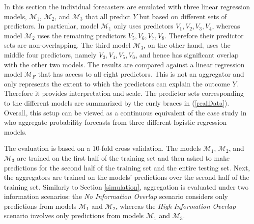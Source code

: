 \documentclass[11pt]{article}
\theoremstyle{definition}
\theoremstyle{definition}
\begin{document}
 In this section the individual forecasters are emulated with three linear regression models, $\mathcal{M}_1$, $\mathcal{M}_2$, and $\mathcal{M}_3$ that all predict $Y$ but based on different sets of predictors. In particular, model $\mathcal{M}_1$ only uses predictors $V_1, V_2, V_3, V_4$, whereas model $\mathcal{M}_2$ uses the remaining predictors $V_5, V_6, V_7, V_8$. Therefore their predictor sets are non-overlapping. The third model $\mathcal{M}_3$, on the other hand, uses the middle four predictors, namely $V_3, V_4, V_5, V_6$, and hence has significant overlap with the other two models. The results are compared against a linear regression model $\mathcal{M}_F$ that has access to all eight predictors. This is not an aggregator and only represents the extent to which the predictors can explain the outcome $Y$. Therefore it provides interpretation and scale. The predictor sets corresponding to the different models are summarized by the curly braces in (\ref{realData}). Overall, this setup can be viewed as a continuous equivalent of the case study in \cite{Ranjan08} who aggregate probability forecasts from three different logistic regression models. 
%

The evaluation is based on a $10$-fold cross validation. The models $\mathcal{M}_1$, $\mathcal{M}_2$, and $\mathcal{M}_3$ are trained on the first half of the training set and then asked to make  predictions for the second half of the training set and the entire testing set. Next, the aggregators are  trained on the models' predictions over the second half of the training set. Similarly to Section \ref{simulation}, aggregation is evaluated under two information scenarios: the \textit{No Information Overlap} scenario considers only predictions from models $\mathcal{M}_1$ and $\mathcal{M}_2$, whereas the \textit{High Information Overlap} scenario involves only predictions from models $\mathcal{M}_1$ and $\mathcal{M}_3$. 
\end{document}
